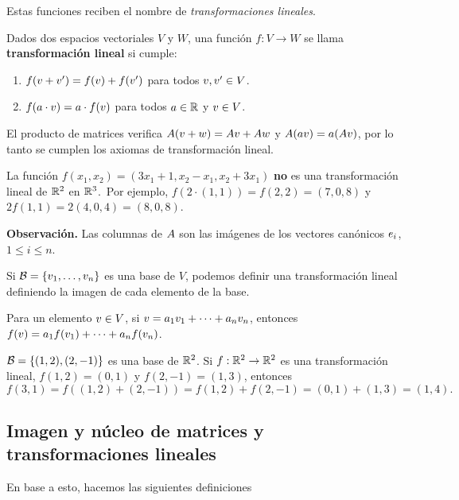 Estas funciones reciben el nombre de \emph{transformaciones lineales}.

\begin{definicion}
Dados dos espacios vectoriales $V$ y $W$, una función $f: V \rightarrow W$ se llama \textbf{transformación lineal} si cumple:
\begin{enumerate}
\item  $f(\vb + \vb')= f(\vb) + f(\vb')$ para todos $\vb, \vb' \in V$.
\item  $f(a \cdot \vb) = a \cdot f(\vb)$ para todos $a \in \mathbb R$ y $\vb \in V$.
\end{enumerate}
\end{definicion}

El producto de matrices verifica $\Ab(\vb+\wb) = \Ab\vb + \Ab\wb$ y $\Ab(a\vb) = a(\Ab\vb)$, por lo tanto se cumplen los axiomas de transformación lineal.

\begin{ejemplo}
La función $f(x_1, x_2) = (3x_1 + 1, x_2 - x_1, x_2 + 3x_1)$ \textbf{no} es una transformación lineal de $\mathbb R^2$ en $\mathbb R^3$.\
Por ejemplo, $f(2 \cdot (1,1)) = f(2,2) = (7, 0, 8)$ y $2f(1,1) = 2(4, 0, 4)= (8,0,8)$.
\end{ejemplo}

\textbf{Observación.} Las columnas de $\Ab$ son las imágenes de los vectores canónicos $\eb_i$, $1 \le i \le n$.

\begin{proposicion} Si $\B = \{\vb_1, \dots, \vb_n\}$ es una base de $V$, podemos definir una transformación lineal definiendo la imagen de cada elemento de la base.
\end{proposicion}

Para un elemento $\vb \in V$, si $\vb = a_1 \vb_1 + \dots + a_n \vb_n$, entonces $f(\vb) = a_1 f(\vb_1) + \dots + a_n f(\vb_n)$.

\begin{ejemplo} $\mathcal B = \{(1,2), (2, -1)\}$ es una base de $\mathbb R^2$. Si $f: \mathbb R^2 \rightarrow \mathbb R^2$ es una transformación lineal, $f(1,2) = (0, 1)$ y $f(2, -1) = (1,3)$, entonces
$$f(3, 1) = f((1,2) + (2, -1)) = f(1,2) + f(2, -1)= (0,1) + (1,3) = (1, 4).$$
\end{ejemplo}

\subsection{Imagen y núcleo de matrices y transformaciones lineales}

En base a esto, hacemos las siguientes definiciones

